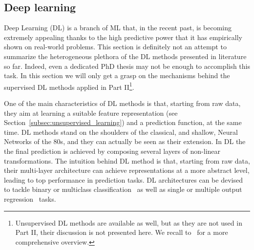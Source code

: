 
	    \subsection{Deep learning} \label{sec:deep_learning}
	    
		Deep Learning (DL) is a branch of ML that, in the recent past, is becoming extremely appealing thanks to the high predictive power that it has empirically shown on real-world problems.
		This section is definitely not an attempt to summarize the heterogeneous plethora of the DL methods presented in literature so far. Indeed, even a dedicated PhD thesis may not be enough to accomplish this task.
		In this section we will only get a grasp on the mechanisms behind the supervised DL methods applied in Part II\footnote{ Unsupervised DL methods are available as well, but as they are not used in Part II, their discussion is not presented here. We recall to~\cite{lecun2015deep, goodfellow2016deep, chollet2018deep} for a more comprehensive overview.}.
	    
	    One of the main characteristics of DL methods is that, starting from raw data, they aim at learning a suitable feature representation (see Section~\ref{subsec:unsupervised_learning}) and a prediction function, at the same time.
	    DL methods stand on the shoulders of the classical, and shallow, Neural Networks of the $80$s, and they can actually be seen as their extension.
	    In DL the the final prediction is achieved by composing several layers of non-linear transformations.
	    The intuition behind DL method is that, starting from raw data, their multi-layer architecture can achieve representations at a more abstract level, leading to top performance in prediction tasks.
	    DL architectures can be devised to tackle binary or multiclass classification~\cite{angermueller2016deep, leung2014deep} as well as single or multiple output regression~\cite{Chen2016GeneEI, ma2015deep} tasks.

